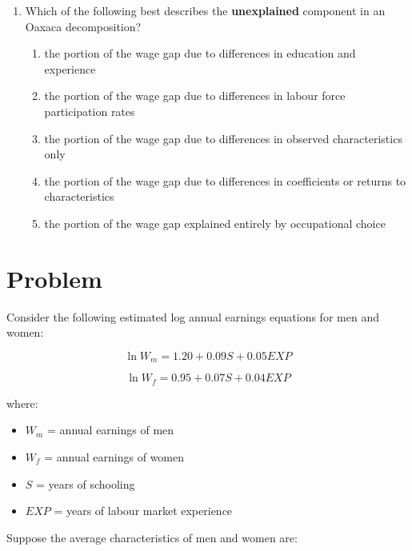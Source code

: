 \documentclass[12pt]{article}
\begin{document}
\begin{enumerate}[label=\textbf{\arabic*.}]
\begin{enumerate}[label=\Alph*)]
    \item adding a variable for years of schooling when schooling differs across groups
    \item removing occupation controls from the regression
    \item increasing the sample size without changing the model
    \item estimating the model without experience
    \item using nominal instead of real wages
\end{enumerate}



\item Which of the following best describes the \textbf{unexplained} component in an Oaxaca decomposition?

\begin{enumerate}[label=\Alph*)]
    \item the portion of the wage gap due to differences in education and experience
    \item the portion of the wage gap due to differences in labour force participation rates
    \item the portion of the wage gap due to differences in observed characteristics only
    \item the portion of the wage gap due to differences in coefficients or returns to characteristics
    \item the portion of the wage gap explained entirely by occupational choice
\end{enumerate}

\end{enumerate}

\section*{ Problem}

Consider the following estimated log annual earnings equations for men and women:

\[
\ln W_m = 1.20 + 0.09S + 0.05EXP
\]

\[
\ln W_f = 0.95 + 0.07S + 0.04EXP
\]

where:

\begin{itemize}
    \item \(W_m\) = annual earnings of men
    \item \(W_f\) = annual earnings of women
    \item \(S\) = years of schooling
    \item \(EXP\) = years of labour market experience
\end{itemize}
\newpage
Suppose the average characteristics of men and women are:
\end{document}
